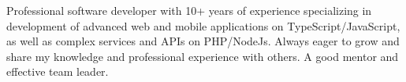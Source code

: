 


\begin{cvparagraph}

Professional software developer with 10+ years of experience specializing in development of advanced web and mobile applications on TypeScript/JavaScript, as well as complex services and APIs on PHP/NodeJs.
Always eager to grow and share my knowledge and professional experience with others. A good mentor and effective team leader.
\end{cvparagraph}
\vspace{-2mm}
